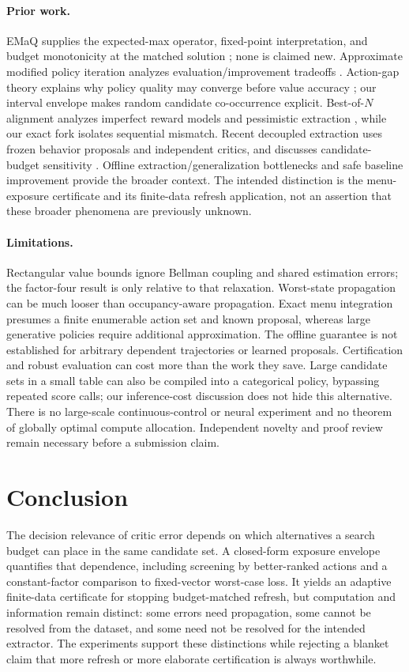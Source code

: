 \documentclass[11pt]{article}
\begin{document}
\paragraph{Prior work.} EMaQ supplies the expected-max operator, fixed-point interpretation, and budget monotonicity at the matched solution \citep{ghasemipour2021emaq}; none is claimed new. Approximate modified policy iteration analyzes evaluation/improvement tradeoffs \citep{scherrer2015ampi}. Action-gap theory explains why policy quality may converge before value accuracy \citep{farahmand2011gap}; our interval envelope makes random candidate co-occurrence explicit. Best-of-$N$ alignment analyzes imperfect reward models and pessimistic extraction \citep{huang2025best}, while our exact fork isolates sequential mismatch. Recent decoupled extraction uses frozen behavior proposals and independent critics, and discusses candidate-budget sensitivity \citep{lin2026decoupling}. Offline extraction/generalization bottlenecks \citep{park2024bottleneck} and safe baseline improvement \citep{laroche2019spibb} provide the broader context. The intended distinction is the menu-exposure certificate and its finite-data refresh application, not an assertion that these broader phenomena are previously unknown.

\paragraph{Limitations.} Rectangular value bounds ignore Bellman coupling and shared estimation errors; the factor-four result is only relative to that relaxation. Worst-state propagation can be much looser than occupancy-aware propagation. Exact menu integration presumes a finite enumerable action set and known proposal, whereas large generative policies require additional approximation. The offline guarantee is not established for arbitrary dependent trajectories or learned proposals. Certification and robust evaluation can cost more than the work they save. Large candidate sets in a small table can also be compiled into a categorical policy, bypassing repeated score calls; our inference-cost discussion does not hide this alternative. There is no large-scale continuous-control or neural experiment and no theorem of globally optimal compute allocation. Independent novelty and proof review remain necessary before a submission claim.

\section{Conclusion}
The decision relevance of critic error depends on which alternatives a search budget can place in the same candidate set. A closed-form exposure envelope quantifies that dependence, including screening by better-ranked actions and a constant-factor comparison to fixed-vector worst-case loss. It yields an adaptive finite-data certificate for stopping budget-matched refresh, but computation and information remain distinct: some errors need propagation, some cannot be resolved from the dataset, and some need not be resolved for the intended extractor. The experiments support these distinctions while rejecting a blanket claim that more refresh or more elaborate certification is always worthwhile.
\end{document}
